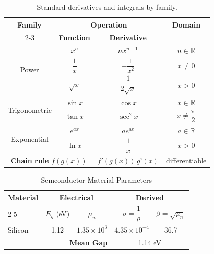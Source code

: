 \documentclass[11pt]{article}
\begin{document}
\begin{table}[H]
\centering
\caption{Standard derivatives and integrals by family.}
\renewcommand{\arraystretch}{1.7}
\begin{tabular}{|c|c|c|c|}
\hline
\multirow{2}{*}{\textbf{Family}} &
\multicolumn{2}{c|}{\textbf{Operation}} &
\multirow{2}{*}{\textbf{Domain}} \\
\cline{2-3}
& \textbf{Function} & \textbf{Derivative} & \\
\hline
\multirow{3}{*}{Power}
& $x^n$ & $n x^{n-1}$ & $n \in \mathbb{R}$ \\ \cline{2-4}
& $\dfrac{1}{x}$ & $-\dfrac{1}{x^2}$ & $x \neq 0$ \\ \cline{2-4}
& $\sqrt{x}$ & $\dfrac{1}{2\sqrt{x}}$ & $x > 0$ \\
\hline
\multirow{2}{*}{Trigonometric}
& $\sin x$ & $\cos x$ & $x \in \mathbb{R}$ \\ \cline{2-4}
& $\tan x$ & $\sec^2 x$ & $x \neq \dfrac{\pi}{2}$ \\
\hline
\multirow{2}{*}{Exponential}
& $e^{ax}$ & $a e^{ax}$ & $a \in \mathbb{R}$ \\ \cline{2-4}
& $\ln x$ & $\dfrac{1}{x}$ & $x > 0$ \\
\hline
\multicolumn{2}{|c|}{\textbf{Chain rule } $f(g(x))$}
& $f'(g(x))\,g’(x)$ & differentiable \\
\hline
\end{tabular}
\end{table}

\begin{table}[htbp]
    
    \centering
    \caption{Semconductor Material Parameters}
    \renewcommand{\arraystretch}{1.7}
    \begin{tabular}{|l|c c|c c|}
        \hline
        \multirow{2}{*}{\textbf{Material}} & \multicolumn{2}{c|}{\textbf{Electrical}} & \multicolumn{2}{c|}{\textbf{Derived}} \\
        \cline{2-5}
        & $E_g$ (eV) & $\mu_n$ & $ \sigma = \dfrac{1}{\rho} $ & $ \beta = \sqrt{\mu_n} $ \\ \hline
        \rowcolor{Orange!40} Silicon & 1.12 & $1.35 \times 10^3$ & $4.35 \times 10^{-4}$ & 36.7 \\ \hline
        \multicolumn{3}{|r|}{\textbf{Mean Gap}} & \multicolumn{2}{c|}{1.14 eV} \\ \hline
    \end{tabular}

\end{table}
\end{document}
